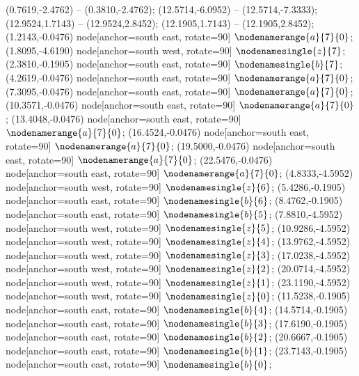    (0.7619,-2.4762) -- (0.3810,-2.4762);
   (12.5714,-6.0952) -- (12.5714,-7.3333);
   (12.9524,1.7143) -- (12.9524,2.8452);
   (12.1905,1.7143) -- (12.1905,2.8452);
   (1.2143,-0.0476) node[anchor=south east, rotate=90] {$\nodenamerange{a}{7}{0}$};
   (1.8095,-4.6190) node[anchor=south west, rotate=90] {$\nodenamesingle{z}{7}$};
   (2.3810,-0.1905) node[anchor=south east, rotate=90] {$\nodenamesingle{b}{7}$};
   (4.2619,-0.0476) node[anchor=south east, rotate=90] {$\nodenamerange{a}{7}{0}$};
   (7.3095,-0.0476) node[anchor=south east, rotate=90] {$\nodenamerange{a}{7}{0}$};
   (10.3571,-0.0476) node[anchor=south east, rotate=90] {$\nodenamerange{a}{7}{0}$};
   (13.4048,-0.0476) node[anchor=south east, rotate=90] {$\nodenamerange{a}{7}{0}$};
   (16.4524,-0.0476) node[anchor=south east, rotate=90] {$\nodenamerange{a}{7}{0}$};
   (19.5000,-0.0476) node[anchor=south east, rotate=90] {$\nodenamerange{a}{7}{0}$};
   (22.5476,-0.0476) node[anchor=south east, rotate=90] {$\nodenamerange{a}{7}{0}$};
   (4.8333,-4.5952) node[anchor=south west, rotate=90] {$\nodenamesingle{z}{6}$};
   (5.4286,-0.1905) node[anchor=south east, rotate=90] {$\nodenamesingle{b}{6}$};
   (8.4762,-0.1905) node[anchor=south east, rotate=90] {$\nodenamesingle{b}{5}$};
   (7.8810,-4.5952) node[anchor=south west, rotate=90] {$\nodenamesingle{z}{5}$};
   (10.9286,-4.5952) node[anchor=south west, rotate=90] {$\nodenamesingle{z}{4}$};
   (13.9762,-4.5952) node[anchor=south west, rotate=90] {$\nodenamesingle{z}{3}$};
   (17.0238,-4.5952) node[anchor=south west, rotate=90] {$\nodenamesingle{z}{2}$};
   (20.0714,-4.5952) node[anchor=south west, rotate=90] {$\nodenamesingle{z}{1}$};
   (23.1190,-4.5952) node[anchor=south west, rotate=90] {$\nodenamesingle{z}{0}$};
   (11.5238,-0.1905) node[anchor=south east, rotate=90] {$\nodenamesingle{b}{4}$};
   (14.5714,-0.1905) node[anchor=south east, rotate=90] {$\nodenamesingle{b}{3}$};
   (17.6190,-0.1905) node[anchor=south east, rotate=90] {$\nodenamesingle{b}{2}$};
   (20.6667,-0.1905) node[anchor=south east, rotate=90] {$\nodenamesingle{b}{1}$};
   (23.7143,-0.1905) node[anchor=south east, rotate=90] {$\nodenamesingle{b}{0}$};
